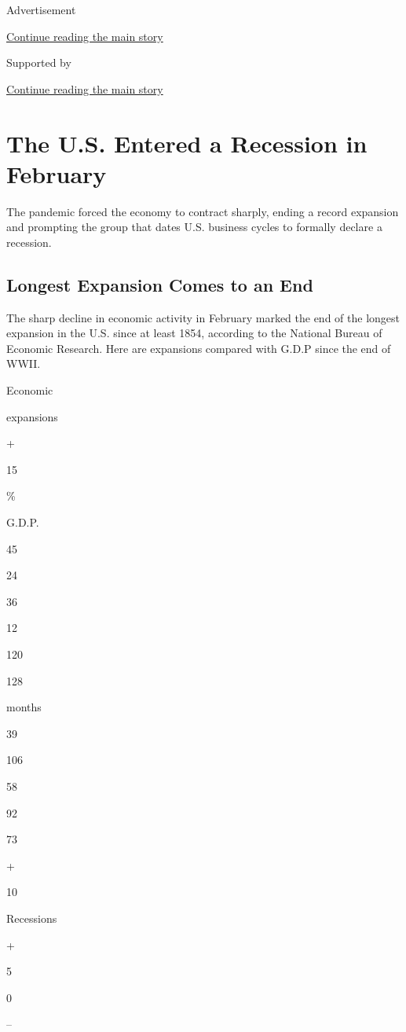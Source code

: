 Advertisement

\protect\hyperlink{after-top}{Continue reading the main story}

Supported by

\protect\hyperlink{after-sponsor}{Continue reading the main story}

\hypertarget{the-us-entered-a-recession-in-february}{%
\section{The U.S. Entered a Recession in
February}\label{the-us-entered-a-recession-in-february}}

The pandemic forced the economy to contract sharply, ending a record
expansion and prompting the group that dates U.S. business cycles to
formally declare a recession.

\hypertarget{longest-expansion-comes-to-an-end}{%
\subsection{Longest Expansion Comes to an
End}\label{longest-expansion-comes-to-an-end}}

The sharp decline in economic activity in February marked the end of the
longest expansion in the U.S. since at least 1854, according to the
National Bureau of Economic Research. Here are expansions compared with
G.D.P since the end of WWII.

Economic

expansions

+

15

\%

G.D.P.

45

24

36

12

120

128

months

39

106

58

92

73

+

10

Recessions

+

5

0

--

